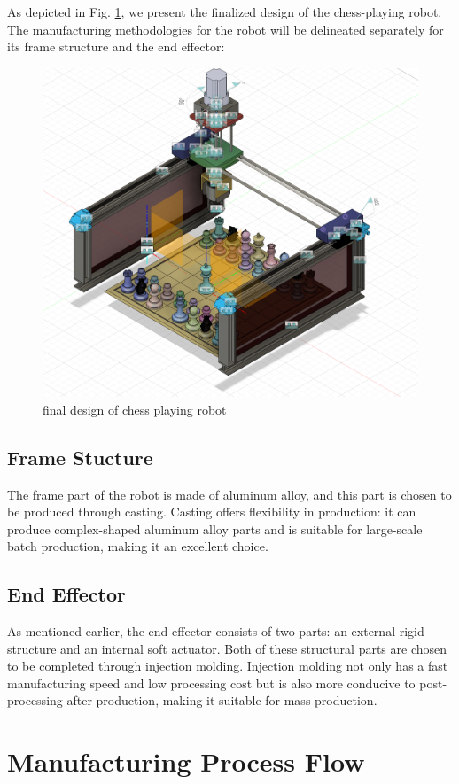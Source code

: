 \documentclass[10pt, a4paper, twocolumn]{article}
\begin{document}
As depicted in Fig. \ref{fig:final design}, we present the finalized design of the chess-playing robot. The manufacturing methodologies for the robot will be delineated separately for its frame structure and the end effector:

\begin{figure}
    \centering
    \includegraphics[width=0.8\linewidth]{final design.png}
    \caption{final design of chess playing robot}
    \label{fig:final design}
\end{figure}

\subsection{Frame Stucture}
The frame part of the robot is made of aluminum alloy, and this part is chosen to be produced through casting. Casting offers flexibility in production: it can produce complex-shaped aluminum alloy parts and is suitable for large-scale batch production, making it an excellent choice.

\subsection{End Effector}
As mentioned earlier, the end effector consists of two parts: an external rigid structure and an internal soft actuator. Both of these structural parts are chosen to be completed through injection molding. Injection molding not only has a fast manufacturing speed and low processing cost but is also more conducive to post-processing after production, making it suitable for mass production.

\section{Manufacturing Process Flow}
\end{document}
